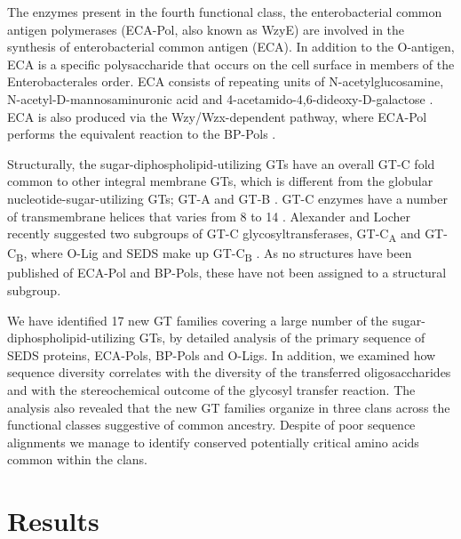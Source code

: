 \documentclass{article}
\begin{document}
The enzymes present in the fourth functional class, the enterobacterial common antigen polymerases (ECA-Pol, also known as WzyE) are involved in the synthesis of enterobacterial common antigen (ECA). In addition to the O-antigen, ECA is a specific polysaccharide that occurs on the cell surface in members of the Enterobacterales order. ECA consists of repeating units of N-acetylglucosamine, N-acetyl-D-mannosaminuronic acid and 4-acetamido-4,6-dideoxy-D-galactose \cite{rai_enterobacterial_2020}. ECA is also produced via the Wzy/Wzx-dependent pathway, where ECA-Pol performs the equivalent reaction to the BP-Pols \cite{rai_enterobacterial_2020}.

Structurally, the sugar-diphospholipid-utilizing GTs have an overall GT-C fold common to other integral membrane GTs, which is different from the globular nucleotide-sugar-utilizing GTs; GT-A and GT-B \cite{lairson_glycosyltransferases_2008}. GT-C enzymes have a number of transmembrane helices that varies from 8 to 14 \cite{lairson_glycosyltransferases_2008, alexander_emerging_2023}. Alexander and Locher recently suggested two subgroups of GT-C glycosyltransferases, GT-C\textsubscript{A} and GT-C\textsubscript{B}, where O-Lig and SEDS make up GT-C\textsubscript{B} \cite{alexander_emerging_2023}. As no structures have been published of ECA-Pol and BP-Pols, these have not been assigned to a structural subgroup. 

We have identified 17 new GT families covering a large number of the sugar-diphospholipid-utilizing GTs, by detailed analysis of the primary sequence of SEDS proteins, ECA-Pols, BP-Pols and O-Ligs. In addition, we examined how sequence diversity correlates with the diversity of the transferred oligosaccharides and with the stereochemical outcome of the glycosyl transfer reaction. The analysis also revealed that the new GT families organize in three clans across the functional classes suggestive of common ancestry. Despite of poor sequence alignments we manage to identify conserved potentially critical amino acids common within the clans.

\section{Results}
\end{document}
